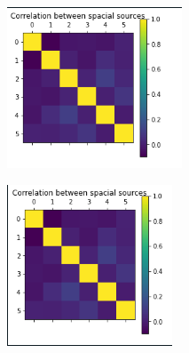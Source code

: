 \documentclass{article}
\begin{document}
\subsection{}
\begin{figure}[H]
\begin{subfigure}{.5\textwidth}
  \centering
  \includegraphics[width=1\linewidth]{corr ts.png}  
  \label{fig:sub-first}
\end{subfigure}
\begin{subfigure}{.5\textwidth}
  \centering
  \includegraphics[width=1\linewidth]{corr tt.png}  
  \label{fig:sub-second}
\end{subfigure}


\end{figure}
\end{document}

